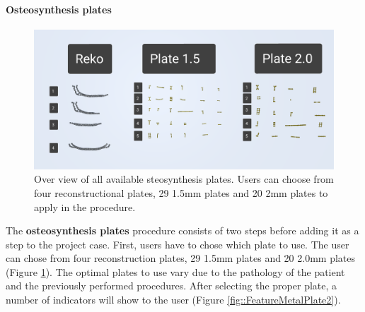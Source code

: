 \paragraph{Osteosynthesis plates}

\begin{figure}[ht]
    \centering
    \includegraphics[width=\linewidth]{images/implementation/features/procedures/osteo_overview.png}
    \caption{\label{fig::FeatureMetalPlate} Over view of all available steosynthesis plates. Users can choose from four reconstructional plates, 29 1.5mm plates and 20 2mm plates to apply in the procedure.}
\end{figure}

The \textbf{osteosynthesis plates} procedure consists of two steps before adding it as a step to the project case.
First, users have to chose which plate to use.
The user can chose from four reconstruction plates, 29 1.5mm plates and 20 2.0mm plates (Figure \ref{fig::FeatureMetalPlate}).
The optimal plates to use vary due to the pathology of the patient and the previously performed procedures.
After selecting the proper plate, a number of indicators will show to the user (Figure \ref{fig::FeatureMetalPlate2}).

